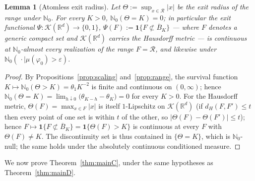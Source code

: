 \documentclass[11pt]{article}
\newtheorem{lemma}[theorem]{Lemma}
\theoremstyle{definition}
\theoremstyle{remark}
\newcommand{\R}{\mathbb{R}}
\newcommand{\bN}{{\mathbb{N}_0}}                 %
\newcommand{\Ran}{\mathcal{R}}                 %
\newcommand{\eps}{\varepsilon}
\numberwithin{equation}{section}
\theoremstyle{plain}
\theoremstyle{definition}
\theoremstyle{remark}
\theoremstyle{plain}
\begin{document}
\begin{lemma}[Atomless exit radius]\label{lem:exitcont}
Let $\Theta:=\sup_{x\in\Ran}|x|$ be the exit radius of the range under
$\bN$. For every $K>0$, $\bN(\Theta=K)=0$; in particular the exit functional
$\Psi:\mathcal K(\R^d)\to\{0,1\}$, $\Psi(F):=\mathbf 1\{F\not\subset\overline B_K\}$
--- where $F$ denotes a generic compact set and $\mathcal K(\R^d)$ carries the
Hausdorff metric --- is continuous at $\bN$-almost every realization of the range
$F=\Ran$, and likewise under $\bN(\,\cdot\mid\mu(\varphi_0)>\eps)$.
\end{lemma}

\begin{proof}
By Propositions~\ref{prop:scaling} and~\ref{prop:range}, the survival
function $K\mapsto\bN(\Theta>K)=\theta_1K^{-2}$ is finite and continuous on
$(0,\infty)$; hence
$\bN(\Theta=K)=\lim_{h\downarrow0}\bigl(\theta_{K-h}-\theta_K\bigr)=0$ for
every $K>0$. For the Hausdorff metric, $\Theta(F)=\max_{x\in F}|x|$ is itself
$1$-Lipschitz on $\mathcal K(\R^d)$ (if $d_H(F,F')\le t$ then every point of one
set is within $t$ of the other, so $|\Theta(F)-\Theta(F')|\le t$); hence
$F\mapsto\mathbf 1\{F\not\subset\overline B_K\}=\mathbf 1\{\Theta(F)>K\}$ is continuous at
every $F$ with $\Theta(F)\neq K$. The discontinuity set is thus contained in
$\{\Theta=K\}$, which is $\bN$-null; the same holds under the absolutely
continuous conditioned measure.
\end{proof}

We now prove Theorem~\ref{thm:mainC}, under the same hypotheses as
Theorem~\ref{thm:mainD}.
\end{document}
